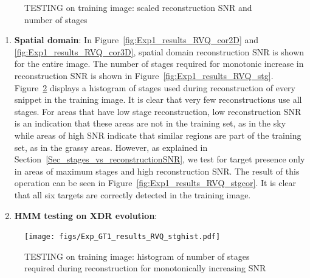 \documentclass[12pt,letterpaper,doublespaced,ETD]{gt-ece-thesis} %
\begin{document}
\begin{Body}
\begin{enumerate}
\begin{figure}
\centering	
{}
\caption{TESTING on training image: scaled reconstruction SNR and number of stages}										
\label{fig:ECE8833a_trainingImage}				
\end{figure}

\begin{enumerate}
	\item \textbf{Spatial domain}:  In Figure~\ref{fig:Exp1_results_RVQ_cor2D} and \ref{fig:Exp1_results_RVQ_cor3D}, spatial domain reconstruction SNR is shown for the entire image.  The number of stages required for monotonic increase in reconstruction SNR is shown in Figure~\ref{fig:Exp1_results_RVQ_stg}.    Figure~\ref{fig:Exp1_results_RVQ_stghist} displays a histogram of stages used during reconstruction of every snippet in the training image.  It is clear that very few reconstructions use all stages.  For areas that have low stage reconstruction, low reconstruction SNR is an indication that these areas are not in the training set, as in the sky while areas of high SNR indicate that similar regions are part of the training set, as in the grassy areas.  However, as explained in Section~\ref{Sec_stages_vs_reconstructionSNR}, we test for target presence only in areas of maximum stages and high reconstruction SNR.  The result of this operation can be seen in Figure~\ref{fig:Exp1_results_RVQ_stgcor}.  It is clear that all six targets are correctly detected in the training image.  
	\item \textbf{HMM testing on XDR evolution}:
\end{enumerate}

\end{enumerate}


\begin{figure}
\centering
\texttt{[image: figs/Exp\_GT1\_results\_RVQ\_stghist.pdf]}
\caption{TESTING on training image: histogram of number of stages required during reconstruction for monotonically increasing SNR}
\label{fig:Exp1_results_RVQ_stghist}
\end{figure}







\end{Body}
\end{document}
